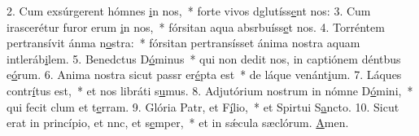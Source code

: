 2. Cum exsúrgerent hómnes \uline{i}n nos,~* forte vivos dglutíss\uline{e}nt nos:
3. Cum irascerétur furor erum \uline{i}n nos,~* fórsitan aqua absrbuíss\uline{e}t nos.
4. Torréntem pertransívit ánma n\uline{o}stra:~* fórsitan pertransísset ánima nostra aquam intleráb\uline{i}lem.
5. Benedctus D\uline{ó}minus~* qui non dedit nos, in captiónem déntbus e\uline{ó}rum.
6. Anima nostra sicut passr er\uline{é}pta est~* de láque venánt\uline{i}um.
7. Láques contr\uline{í}tus est,~* et nos libráti s\uline{u}mus.
8. Adjutórium nostrum in nómne D\uline{ó}mini,~* qui fecit clum et t\uline{e}rram.
9. Glória Patr, et F\uline{í}lio,~* et Spirtui S\uline{a}ncto.
10. Sicut erat in princípio, et nnc, et s\uline{e}mper,~* et in sǽcula sæclórum. \uline{A}men.
